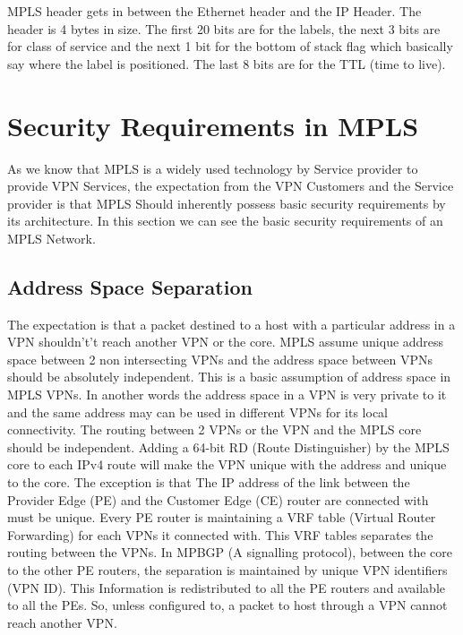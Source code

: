 MPLS header gets in between the Ethernet header and the IP Header. The header is 4 bytes in size. The first 20 bits are for the labels, the next 3 bits are for class of service and the next 1 bit for the bottom of stack flag which basically say where the label is positioned. The last 8 bits are for the TTL (time to live). 

\section{Security Requirements in MPLS}

As we know that MPLS is a widely used technology by Service provider to provide VPN Services, the expectation from the VPN Customers and the Service provider is that MPLS Should inherently possess basic security requirements\cite{2010} by its architecture. In this section we can see the basic security requirements of an MPLS Network\cite{davie_farrel_2008}.

\subsection{Address Space Separation}


The expectation is that a packet destined to a host with a particular address in a VPN shouldn't’t reach another VPN or the core. MPLS assume unique address space between 2 non intersecting VPNs and the address space between VPNs should be absolutely independent. This is a basic assumption of address space in MPLS VPNs. In another words the address space in a VPN is very private to it and the same address may can be used in different VPNs for its local connectivity. The routing between 2 VPNs or the VPN and the MPLS core should be independent. Adding a 64-bit RD (Route Distinguisher) by the MPLS core to each IPv4 route will make the VPN unique with the address and unique to the core. The exception is that The IP address of the link between the Provider Edge (PE) and the Customer Edge (CE) router are connected with must be unique. Every PE router is maintaining a VRF table (Virtual Router Forwarding) for each VPNs it connected with. This VRF tables separates the routing between the VPNs. In MPBGP (A signalling protocol), between the core to the other PE routers, the separation is maintained by unique VPN identifiers (VPN ID). This Information is redistributed to all the PE routers and available to all the PEs. So, unless configured to, a packet to host through a VPN cannot reach another VPN.

